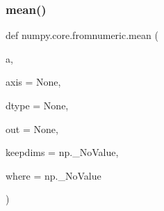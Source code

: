 \subsubsection{\texorpdfstring{mean()}{mean()}}
{\footnotesize\ttfamily def numpy.\+core.\+fromnumeric.\+mean (\begin{DoxyParamCaption}\item[{}]{a,  }\item[{}]{axis = {\ttfamily None},  }\item[{}]{dtype = {\ttfamily None},  }\item[{}]{out = {\ttfamily None},  }\item[{}]{keepdims = {\ttfamily np.\+\_\+NoValue},  }\item[{}]{where = {\ttfamily np.\+\_\+NoValue} }\end{DoxyParamCaption})}

